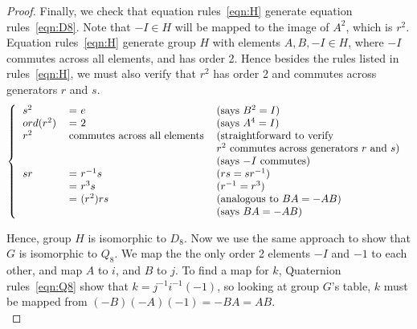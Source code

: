 \documentclass{article}
\begin{document}
\begin{enumerate}
\begin{enumerate}
\begin{proof}
          Finally, we check that equation rules~\ref{eqn:H} generate
          equation rules~\ref{eqn:D8}. Note that $-I\in H$ will be mapped
          to the image of $A^2$, which is $r^2$. Equation rules~\ref{eqn:H}
          generate group $H$ with elements $A,B,-I\in H$, where $-I$
          commutes across all elements, and has order 2. Hence besides the
          rules listed in rules~\ref{eqn:H}, we must also verify that
          $r^2$ has order 2 and commutes across generators $r$ and $s$.
          \[\left \{
            \begin{tabular}{lll}
              $s^2$ & = $e$         & (says $B^2=I$) \\
              $ord(r^2)$ & = $2$    & (says $A^4=I$) \\
              $r^2$ & commutes across all elements & (straightforward to verify \\
                    &               & $r^2$ commutes across generators $r$ and $s$) \\
                    &               & (says $-I$ commutes) \\
              $sr$  & = $r^{-1}s$   & ($rs=sr^{-1}$) \\
                    & = $r^3s$      & ($r^{-1}=r^3$) \\
                    & = $(r^2)rs$   & (analogous to $BA=-AB$) \\
                    &               & (says $BA=-AB$) \\
            \end{tabular}
          \right .\ \]

          Hence, group $H$ is isomorphic to $D_8$. Now we use the same
          approach to show that $G$ is isomorphic to $Q_8$. We map the the
          only order 2 elements $-I$ and $-1$ to each other, and map $A$ to
          $i$, and $B$ to $j$. To find a map for $k$, Quaternion
          rules~\ref{eqn:Q8} show that $k=j^{-1}i^{-1}(-1)$, so looking at
          group $G$'s table, $k$ must be mapped from $(-B)(-A)(-1)=-BA=AB$.
          \\


\end{proof}
\end{enumerate}
\end{enumerate}
\end{document}

